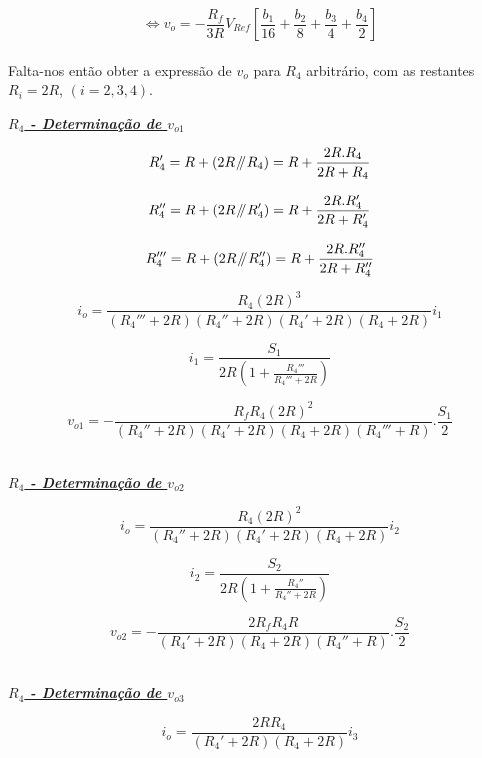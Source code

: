 \documentclass[a4paper,11pt]{report}
\newcommand{\parallelsum}{\mathbin{\!/\mkern-5mu/\!}} %
\begin{document}
$$\Leftrightarrow v_o=-\frac{R_f}{3R}V_{Ref}\left[\frac{b_1}{16}+\frac{b_2}{8}+\frac{b_3}{4}+\frac{b_4}{2}\right]$$\\

Falta-nos então obter a expressão de $v_o$ para $R_4$ arbitrário, com as restantes $R_i=2R$, $\left(i=2,3,4\right)$.\\

\par

\large\underline{\textit{\textbf{$R_4$ - Determinação de $v_{o1}$}}}\\
\par

$$R_4'=R+\left(2R\parallelsum R_4\right)=R+\frac{2R.R_4}{2R+R_4}$$

$$R_4''=R+\left(2R\parallelsum R_4'\right)=R+\frac{2R.R_4'}{2R+R_4'}$$

$$R_4'''=R+\left(2R\parallelsum R_4''\right)=R+\frac{2R.R_4''}{2R+R_4''}$$

$$i_o=\frac{R_4\left(2R\right)^3}{\left(R_4'''+2R\right)\left(R_4''+2R\right)\left(R_4'+2R\right)\left(R_4+2R\right)}i_1$$

$$i_1=\frac{S_1}{2R\left(1+\frac{R_4'''}{R_4'''+2R}\right)}$$

$$v_{o1}=-\frac{R_fR_4\left(2R\right)^2}{\left(R_4''+2R\right)\left(R_4'+2R\right)\left(R_4+2R\right)\left(R_4'''+R\right)}.\frac{S_1}{2}$$\\

\par

\large\underline{\textit{\textbf{$R_4$ - Determinação de $v_{o2}$}}}\\
\par

$$i_o=\frac{R_4\left(2R\right)^2}{\left(R_4''+2R\right)\left(R_4'+2R\right)\left(R_4+2R\right)}i_2$$

$$i_2=\frac{S_2}{2R\left(1+\frac{R_4''}{R_4''+2R}\right)}$$

$$v_{o2}=-\frac{2R_fR_4R}{\left(R_4'+2R\right)\left(R_4+2R\right)\left(R_4''+R\right)}.\frac{S_2}{2}$$\\

\par

\large\underline{\textit{\textbf{$R_4$ - Determinação de $v_{o3}$}}}\\
\par

$$i_o=\frac{2RR_4}{\left(R_4'+2R\right)\left(R_4+2R\right)}i_3$$
\end{document}
